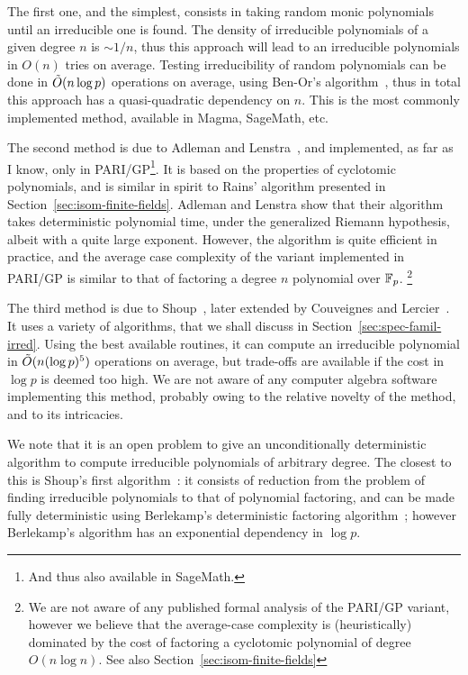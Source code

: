 \documentclass{report}
\theoremstyle{plain}
\theoremstyle{definition}
\begin{document}
The first one, and the simplest, consists in taking random monic
polynomials until an irreducible one is found. %
The density of irreducible polynomials of a given degree $n$ is
$\sim 1/n$, thus this approach will lead to an irreducible polynomials
in $O(n)$ tries on average. %
Testing irreducibility of random polynomials can be done in
$\tilde{O}(n\log p)$ operations on average, using Ben-Or's
algorithm~\cite{Ben-Or1981,10.1007/978-3-642-60539-0_27}, thus in
total this approach has a quasi-quadratic dependency on $n$. %
This is the most commonly implemented method, available in Magma,
SageMath, etc.

The second method is due to Adleman and
Lenstra~\cite{Adleman-Lenstra}, and implemented, as far as I know,
only in PARI/GP\footnote{And thus also available in SageMath.}. %
It is based on the properties of cyclotomic polynomials, and is
similar in spirit to Rains' algorithm presented in
Section~\ref{sec:isom-finite-fields}. %
Adleman and Lenstra show that their algorithm takes deterministic
polynomial time, under the generalized Riemann hypothesis, albeit with
a quite large exponent. %
However, the algorithm is quite efficient in practice, and the average
case complexity of the variant implemented in PARI/GP is similar to
that of factoring a degree $n$ polynomial over $\mathbb{F}_p$.%
\footnote{We are not aware of any published formal analysis of the
  PARI/GP variant, however we believe that the average-case complexity
  is (heuristically) dominated by the cost of factoring a cyclotomic
  polynomial of degree $O(n\log n)$. %
  See also Section~\ref{sec:isom-finite-fields}} %

The third method is due to Shoup~\cite{Shoup_1990,shoup93,shoup94},
later extended by Couveignes and
Lercier~\cite{couveignes+lercier11,DeDoSc13}. %
It uses a variety of algorithms, that we shall discuss in
Section~\ref{sec:spec-famil-irred}. %
Using the best available routines, it can compute an irreducible
polynomial in $\tilde{O}(n(\log p)^5)$ operations on average, but
trade-offs are available if the cost in $\log p$ is deemed too high. %
We are not aware of any computer algebra software implementing this
method, probably owing to the relative novelty of the method, and to
its intricacies. %

We note that it is an open problem to give an unconditionally
deterministic algorithm to compute irreducible polynomials of
arbitrary degree. %
The closest to this is Shoup's first algorithm~\cite{Shoup_1990}: it
consists of reduction from the problem of finding irreducible
polynomials to that of polynomial factoring, and can be made fully
deterministic using Berlekamp's deterministic factoring
algorithm~\cite{berlekamp1970factoring}; however Berlekamp's algorithm
has an exponential dependency in $\log p$.
\end{document}
